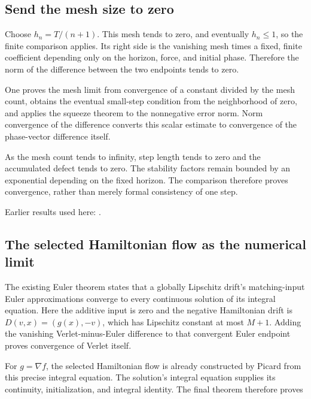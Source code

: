 \documentclass[11pt,a4paper]{report}
\begin{document}
\subsection{\texorpdfstring{Send the mesh size to zero}{Send the mesh size to zero}}
\label{report-step-KineticLangevin-HamiltonianConvergence-lean-5}


Choose \(h_n=T/(n+1)\). This mesh tends to zero, and eventually \(h_n\le1\), so the finite comparison applies. Its right side is the vanishing mesh times a fixed, finite coefficient depending only on the horizon, force, and initial phase. Therefore the norm of the difference between the two endpoints tends to zero.



One proves the mesh limit from convergence of a constant divided by the mesh count, obtains the eventual small-step condition from the neighborhood of zero, and applies the squeeze theorem to the nonnegative error norm. Norm convergence of the difference converts this scalar estimate to convergence of the phase-vector difference itself.



As the mesh count tends to infinity, step length tends to zero and the accumulated defect tends to zero. The stability factors remain bounded by an exponential depending on the fixed horizon. The comparison therefore proves convergence, rather than merely formal consistency of one step.



Earlier results used here: \cite[Section~3.16.1]{LangevinLean2026ULASC}.
\subsection{\texorpdfstring{The selected Hamiltonian flow as the numerical limit}{The selected Hamiltonian flow as the numerical limit}}
\label{report-step-KineticLangevin-HamiltonianConvergence-lean-6}


The existing Euler theorem states that a globally Lipschitz drift's matching-input Euler approximations converge to every continuous solution of its integral equation. Here the additive input is zero and the negative Hamiltonian drift is \(D(v,x)=(g(x),-v)\), which has Lipschitz constant at most \(M+1\). Adding the vanishing Verlet-minus-Euler difference to that convergent Euler endpoint proves convergence of Verlet itself.



For \(g=\nabla f\), the selected Hamiltonian flow is already constructed by Picard from this precise integral equation. The solution’s integral equation supplies its continuity, initialization, and integral identity. The final theorem therefore proves
\end{document}

